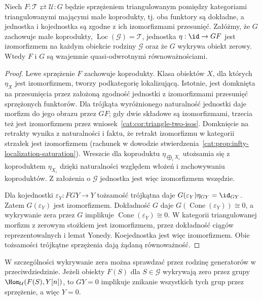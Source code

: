 \begin{lemat}\label{cat:lem:morita-adjoint-generator}
Niech $F:\mathcal T\rightleftarrows\mathcal U:G$ będzie sprzężeniem triangulowanym pomiędzy kategoriami triangulowanymi mającymi małe koprodukty, tj. oba funktory są dokładne, a jednostka i kojednostka są zgodne z ich izomorfizmami przesunięć. Załóżmy, że $G$ zachowuje małe koprodukty, $\operatorname{Loc}(\mathcal G)=\mathcal T$, jednostka $\eta:\id\to GF$ jest izomorfizmem na każdym obiekcie rodziny $\mathcal G$ oraz że $G$ wykrywa obiekt zerowy. Wtedy $F$ i $G$ są wzajemnie quasi-odwrotnymi równoważnościami.
\end{lemat}
\begin{proof}
Lewe sprzężenie $F$ zachowuje koprodukty. Klasa obiektów $X$, dla których $\eta_X$ jest izomorfizmem, tworzy podkategorię lokalizującą. Istotnie, jest domknięta na przesunięcia przez założoną zgodność jednostki z izomorfizmami przesunięć sprzężonych funktorów. Dla trójkąta wyróżnionego naturalność jednostki daje morfizm do jego obrazu przez $GF$; gdy dwie składowe są izomorfizmami, trzecia też jest izomorfizmem przez wniosek~\ref{cat:cor:triangle-two-isos}. Domknięcie na retrakty wynika z naturalności i faktu, że retrakt izomorfizmu w kategorii strzałek jest izomorfizmem (rachunek w dowodzie stwierdzenia~\ref{cat:prop:infty-localization-saturation}). Wreszcie dla koproduktu $\eta_{\bigoplus_i X_i}$ utożsamia się z koproduktem $\eta_{X_i}$ dzięki naturalności względem włożeń i zachowywaniu koproduktów. Z założenia o $\mathcal G$ jednostka jest więc izomorfizmem wszędzie.

Dla kojednostki $\varepsilon_Y:FGY\to Y$ tożsamość trójkątna daje $G(\varepsilon_Y)\eta_{GY}=\id_{GY}$. Zatem $G(\varepsilon_Y)$ jest izomorfizmem. Dokładność $G$ daje $G(\operatorname{Cone}(\varepsilon_Y))\cong0$, a wykrywanie zera przez $G$ implikuje $\operatorname{Cone}(\varepsilon_Y)\cong0$. W kategorii triangulowanej morfizm z zerowym stożkiem jest izomorfizmem, przez dokładność ciągów reprezentowalnych i lemat Yonedy. Koejednostka jest więc izomorfizmem. Obie tożsamości trójkątne sprzężenia dają żądaną równoważność.
\end{proof}

W szczególności wykrywanie zera można sprawdzać przez rodzinę generatorów w przeciwdziedzinie. Jeżeli obiekty $F(S)$ dla $S\in\mathcal G$ wykrywają zero przez grupy $\Hom_{\mathcal U}(F(S),Y[n])$, to $GY=0$ implikuje znikanie wszystkich tych grup przez sprzężenie, a więc $Y=0$.

